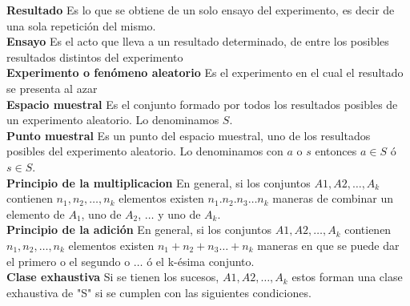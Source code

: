 \documentclass[10pt,a4paper]{article}
\begin{document}
\textbf{Resultado} Es lo que se obtiene de un solo ensayo del experimento, es decir de una sola repetición del mismo.\\

\textbf{Ensayo} Es el acto que lleva a un resultado determinado, de entre los posibles resultados distintos del experimento\\

\textbf{Experimento o fenómeno aleatorio} Es el experimento en el cual el resultado se presenta al azar\\

\textbf{Espacio muestral} Es el conjunto formado por todos los resultados posibles de un experimento aleatorio. Lo denominamos $S$.\\

\textbf{Punto muestral} Es un punto del espacio muestral, uno de los resultados posibles del experimento aleatorio. Lo denominamos con $a$ o $s$ entonces $a\in S$ ó $s \in S$.\\

\textbf{Principio de la multiplicacion} En general, si los conjuntos $A1,A2,\dots,A_k$ contienen $n_1,n_2,\dots,n_k$ elementos existen $n_1.n_2.n_3\dots n_k$ maneras de combinar un elemento de $A_1$, uno de $A_2$, $\dots$ y uno de $A_k$.\\

\textbf{Principio de la adición} En general, si los conjuntos $A1,A2,\dots,A_k$ contienen $n_1,n_2,\dots,n_k$ elementos existen $n_1+n_2+n_3\dots+n_k$ maneras en que se puede dar el primero o el segundo o $\dots$ ó el k-ésima conjunto. \\

\textbf{Clase exhaustiva} Si se tienen los sucesos, $A1,A2,\dots,A_k$ estos forman una clase exhaustiva de "S" si se cumplen con las siguientes condiciones.\\
\end{document}
